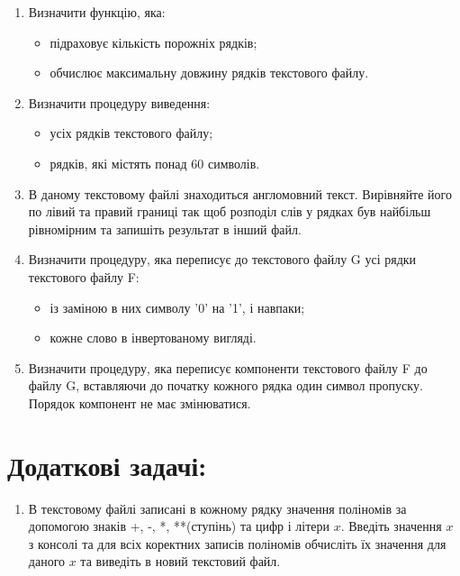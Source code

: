 \documentclass[a5paper,titlepage,openany,twoside,
]
{book_unv}%
\begin{document}
\begin{enumerate}
\begin{enumerate}
\item
 Визначити функцію, яка:
\begin{itemize}
\item підраховує кількість порожніх рядків;
\item обчислює максимальну довжину рядків текстового файлу.
\end{itemize}

\item Визначити процедуру виведення:
\begin{itemize}
\item усіх рядків текстового файлу;
\item рядків, які містять понад 60 символів.
\end{itemize}

\item
В даному текстовому файлі знаходиться англомовний текст. Вирівняйте
його по лівий та правий границі так щоб розподіл слів у рядках був
найбільш рівномірним та запишіть результат в інший файл.

\item
Визначити процедуру, яка переписує до текстового файлу G усі 
рядки текстового файлу F:
\begin{itemize}
\item із заміною в них символу '0' на '1', і навпаки;
\item кожне слово в інвертованому вигляді.
\end{itemize}

\item
Визначити процедуру, яка переписує компоненти текстового 
файлу F до файлу G, вставляючи до початку кожного рядка один символ пропуску.
Порядок компонент не має змінюватися.
\end{enumerate}


\section{Додаткові задачі:}

\begin{enumerate}
\def\labelenumi{\arabic{enumi})}
\setcounter{enumi}{27}
\item
  В текстовому файлі записані в кожному рядку значення поліномів за
  допомогою знаків +, -, *, **(ступінь) та цифр і літери $x$. Введіть
  значення $x$ з консолі та для всіх коректних записів поліномів обчисліть
  їх значення для даного $x$ та виведіть в новий текстовий файл.




\end{enumerate}
\end{enumerate}
\end{document}
